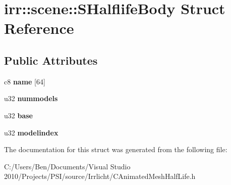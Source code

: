 \hypertarget{structirr_1_1scene_1_1_s_halflife_body}{\section{irr\-:\-:scene\-:\-:S\-Halflife\-Body Struct Reference}
\label{structirr_1_1scene_1_1_s_halflife_body}
}
\subsection*{Public Attributes}
\begin{DoxyCompactItemize}
\item 
\hypertarget{structirr_1_1scene_1_1_s_halflife_body_a44ccb69c08efa2d0ff5e0c282904fe0b}{c8 {\bfseries name} \mbox{[}64\mbox{]}}\label{structirr_1_1scene_1_1_s_halflife_body_a44ccb69c08efa2d0ff5e0c282904fe0b}

\item 
\hypertarget{structirr_1_1scene_1_1_s_halflife_body_ae774b07623b5356799ac5a0dc725ebce}{u32 {\bfseries nummodels}}\label{structirr_1_1scene_1_1_s_halflife_body_ae774b07623b5356799ac5a0dc725ebce}

\item 
\hypertarget{structirr_1_1scene_1_1_s_halflife_body_aa795f0b7d3ad6a4c05bcbe6067dcccb6}{u32 {\bfseries base}}\label{structirr_1_1scene_1_1_s_halflife_body_aa795f0b7d3ad6a4c05bcbe6067dcccb6}

\item 
\hypertarget{structirr_1_1scene_1_1_s_halflife_body_a81580738342fe66a607752a09a9966d6}{u32 {\bfseries modelindex}}\label{structirr_1_1scene_1_1_s_halflife_body_a81580738342fe66a607752a09a9966d6}

\end{DoxyCompactItemize}


The documentation for this struct was generated from the following file\-:\begin{DoxyCompactItemize}
\item 
C\-:/\-Users/\-Ben/\-Documents/\-Visual Studio 2010/\-Projects/\-P\-S\-I/source/\-Irrlicht/C\-Animated\-Mesh\-Half\-Life.\-h\end{DoxyCompactItemize}
